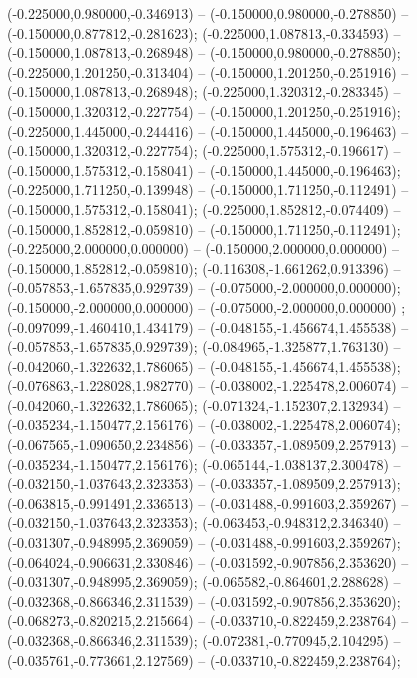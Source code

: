  (-0.225000,0.980000,-0.346913) -- (-0.150000,0.980000,-0.278850) -- (-0.150000,0.877812,-0.281623);
 (-0.225000,1.087813,-0.334593) -- (-0.150000,1.087813,-0.268948) -- (-0.150000,0.980000,-0.278850);
 (-0.225000,1.201250,-0.313404) -- (-0.150000,1.201250,-0.251916) -- (-0.150000,1.087813,-0.268948);
 (-0.225000,1.320312,-0.283345) -- (-0.150000,1.320312,-0.227754) -- (-0.150000,1.201250,-0.251916);
 (-0.225000,1.445000,-0.244416) -- (-0.150000,1.445000,-0.196463) -- (-0.150000,1.320312,-0.227754);
 (-0.225000,1.575312,-0.196617) -- (-0.150000,1.575312,-0.158041) -- (-0.150000,1.445000,-0.196463);
 (-0.225000,1.711250,-0.139948) -- (-0.150000,1.711250,-0.112491) -- (-0.150000,1.575312,-0.158041);
 (-0.225000,1.852812,-0.074409) -- (-0.150000,1.852812,-0.059810) -- (-0.150000,1.711250,-0.112491);
 (-0.225000,2.000000,0.000000) -- (-0.150000,2.000000,0.000000) -- (-0.150000,1.852812,-0.059810);
 (-0.116308,-1.661262,0.913396) -- (-0.057853,-1.657835,0.929739) -- (-0.075000,-2.000000,0.000000);
 (-0.150000,-2.000000,0.000000) -- (-0.075000,-2.000000,0.000000) ;
 (-0.097099,-1.460410,1.434179) -- (-0.048155,-1.456674,1.455538) -- (-0.057853,-1.657835,0.929739);
 (-0.084965,-1.325877,1.763130) -- (-0.042060,-1.322632,1.786065) -- (-0.048155,-1.456674,1.455538);
 (-0.076863,-1.228028,1.982770) -- (-0.038002,-1.225478,2.006074) -- (-0.042060,-1.322632,1.786065);
 (-0.071324,-1.152307,2.132934) -- (-0.035234,-1.150477,2.156176) -- (-0.038002,-1.225478,2.006074);
 (-0.067565,-1.090650,2.234856) -- (-0.033357,-1.089509,2.257913) -- (-0.035234,-1.150477,2.156176);
 (-0.065144,-1.038137,2.300478) -- (-0.032150,-1.037643,2.323353) -- (-0.033357,-1.089509,2.257913);
 (-0.063815,-0.991491,2.336513) -- (-0.031488,-0.991603,2.359267) -- (-0.032150,-1.037643,2.323353);
 (-0.063453,-0.948312,2.346340) -- (-0.031307,-0.948995,2.369059) -- (-0.031488,-0.991603,2.359267);
 (-0.064024,-0.906631,2.330846) -- (-0.031592,-0.907856,2.353620) -- (-0.031307,-0.948995,2.369059);
 (-0.065582,-0.864601,2.288628) -- (-0.032368,-0.866346,2.311539) -- (-0.031592,-0.907856,2.353620);
 (-0.068273,-0.820215,2.215664) -- (-0.033710,-0.822459,2.238764) -- (-0.032368,-0.866346,2.311539);
 (-0.072381,-0.770945,2.104295) -- (-0.035761,-0.773661,2.127569) -- (-0.033710,-0.822459,2.238764);
